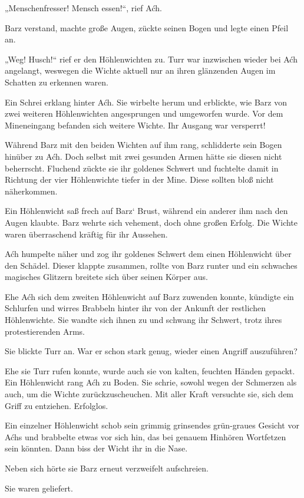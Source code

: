 „Menschenfresser! Mensch essen!“, rief Aćh.

Barz verstand, machte große Augen, zückte seinen Bogen und legte einen Pfeil an.

„Weg! Husch!“ rief er den Höhlenwichten zu. Turr war inzwischen wieder bei Aćh angelangt, weswegen die Wichte aktuell nur an ihren glänzenden Augen im Schatten zu erkennen waren.

Ein Schrei erklang hinter Aćh. Sie wirbelte herum und erblickte, wie Barz von zwei weiteren Höhlenwichten angesprungen und umgeworfen wurde. Vor dem Mineneingang befanden sich weitere Wichte. Ihr Ausgang war versperrt!

Während Barz mit den beiden Wichten auf ihm rang, schlidderte sein Bogen hinüber zu Aćh. Doch selbst mit zwei gesunden Armen hätte sie diesen nicht beherrscht. Fluchend zückte sie ihr goldenes Schwert und fuchtelte damit in Richtung der vier Höhlenwichte tiefer in der Mine. Diese sollten bloß nicht näherkommen.

Ein Höhlenwicht saß frech auf Barz‘ Brust, während ein anderer ihm nach den Augen klaubte. Barz wehrte sich vehement, doch ohne großen Erfolg. Die Wichte waren überraschend kräftig für ihr Aussehen.

Aćh humpelte näher und zog ihr goldenes Schwert dem einen Höhlenwicht über den Schädel. Dieser klappte zusammen, rollte von Barz runter und ein schwaches magisches Glitzern breitete sich über seinen Körper aus.

Ehe Aćh sich dem zweiten Höhlenwicht auf Barz zuwenden konnte, kündigte ein Schlurfen und wirres Brabbeln hinter ihr von der Ankunft der restlichen Höhlenwichte. Sie wandte sich ihnen zu und schwang ihr Schwert, trotz ihres protestierenden Arms.

Sie blickte Turr an. War er schon stark genug, wieder einen Angriff auszuführen?

Ehe sie Turr rufen konnte, wurde auch sie von kalten, feuchten Händen gepackt. Ein Höhlenwicht rang Aćh zu Boden. Sie schrie, sowohl wegen der Schmerzen als auch, um die Wichte zurückzuscheuchen. Mit aller Kraft versuchte sie, sich dem Griff zu entziehen. Erfolglos.

Ein einzelner Höhlenwicht schob sein grimmig grinsendes grün-graues Gesicht vor Aćhs und brabbelte etwas vor sich hin, das bei genauem Hinhören Wortfetzen sein könnten. Dann biss der Wicht ihr in die Nase.

Neben sich hörte sie Barz erneut verzweifelt aufschreien.

Sie waren geliefert.

